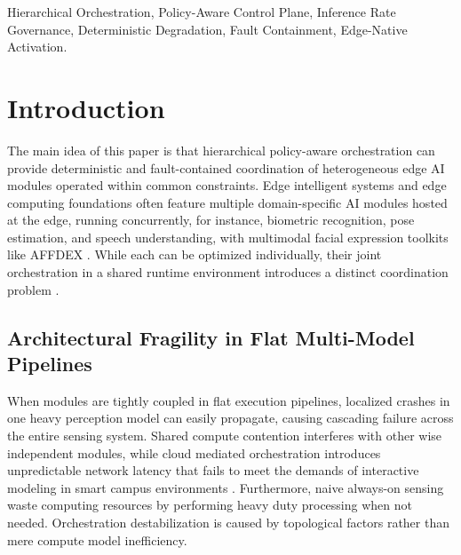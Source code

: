 \documentclass[conference]{IEEEtran}
\begin{document}
\begin{IEEEkeywords}
Hierarchical Orchestration, Policy-Aware Control Plane, Inference Rate Governance, Deterministic Degradation, Fault Containment, Edge-Native Activation.
\end{IEEEkeywords}

\section{Introduction}

The main idea of this paper is that hierarchical policy-aware orchestration can provide deterministic and fault-contained coordination of heterogeneous edge AI modules operated within common constraints. Edge intelligent systems \cite{b20} and edge computing foundations \cite{b11, b38, b39} often feature multiple domain-specific AI modules hosted at the edge, running concurrently, for instance, biometric recognition, pose estimation, and speech understanding, with multimodal facial expression toolkits like AFFDEX \cite{b7}. While each can be optimized individually, their joint orchestration in a shared runtime environment introduces a distinct coordination problem \cite{b14, b21}.

\subsection{Architectural Fragility in Flat Multi-Model Pipelines}
When modules are tightly coupled in flat execution pipelines, localized crashes in one heavy perception model can easily propagate, causing cascading failure across the entire sensing system. Shared compute contention interferes with other wise independent modules, while cloud mediated orchestration introduces unpredictable network latency that fails to meet the demands of interactive modeling in smart campus environments \cite{b4, b14, b19}. Furthermore, naive always-on sensing waste computing resources by performing heavy duty processing when not needed. Orchestration destabilization is caused by topological factors rather than mere compute model inefficiency.
\end{document}
